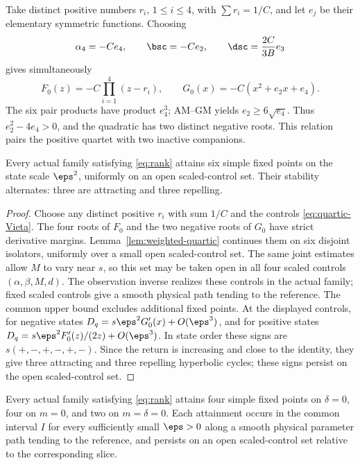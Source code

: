 Take distinct positive numbers \(r_i\), \(1\le i\le4\), with
\(\sum r_i=1/C\), and let \(e_j\) be their elementary symmetric
functions. Choosing
\begin{equation}\label{eq:quartic-Vieta}
 \alpha_4=-Ce_4,\qquad \bsc=-Ce_2,\qquad \dsc=\frac{2C}{3B}e_3
\end{equation}
gives simultaneously
\[
 F_0(z)=-C\prod_{i=1}^4(z-r_i),\qquad
 G_0(x)=-C(x^2+e_2x+e_4).
\]
The six pair products have product \(e_4^3\); AM--GM yields
\(e_2\ge6\sqrt{e_4}\). Thus \(e_2^2-4e_4>0\), and the quadratic
has two distinct negative roots. This relation pairs the positive
quartet with two inactive companions.

\begin{proposition}
\label{prop:single-scale-six}
Every actual family satisfying \eqref{eq:rank} attains six simple fixed
points on the state scale $\eps^2$, uniformly on an open scaled-control
set. Their stability alternates: three are attracting and three repelling.
\end{proposition}

\begin{proof}
Choose any distinct positive $r_i$ with sum $1/C$ and the controls
\eqref{eq:quartic-Vieta}. The four roots of $F_0$ and the two negative
roots of $G_0$ have strict derivative margins. Lemma~\ref{lem:weighted-quartic}
continues them on six disjoint isolators, uniformly over a small open
scaled-control set. The same joint estimates allow \(M\) to vary near
\(s\), so this set may be taken open in all four scaled controls
\((\alpha,\beta,M,d)\). The observation inverse realizes these controls in the
actual family; fixed scaled controls give a smooth physical path tending
to the reference. The common upper bound excludes additional fixed points.
At the displayed controls, for negative states $D_q=s\eps^2G_0'(x)+O(\eps^3)$, and for positive
states $D_q=s\eps^2F_0'(z)/(2z)+O(\eps^3)$. In state order these signs
are $s(+,-,+,-,+,-)$. Since the return is increasing and close to the
identity, they give three attracting and three repelling hyperbolic cycles;
these signs persist on the open scaled-control set.
\end{proof}

\begin{proposition}
\label{prop:sharp-slice-attainment}
Every actual family satisfying \eqref{eq:rank} attains four simple
fixed points on \(\delta=0\), four on \(m=0\), and two on
\(m=\delta=0\). Each attainment occurs in the common interval \(I\)
for every sufficiently small \(\eps>0\) along a smooth physical
parameter path tending to the reference, and persists on an open
scaled-control set relative to the corresponding slice.
\end{proposition}


